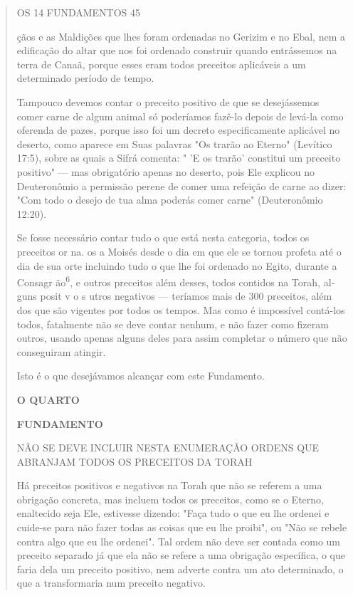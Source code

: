 \begin{quote}
OS 14 FUNDAMENTOS 45

çãos e as Maldições que lhes foram ordenadas no Gerizim e no Ebal, nem a
edi­ficação do altar que nos foi ordenado construir quando entrássemos
na terra de Canaã, porque esses eram todos preceitos aplicáveis a um
determinado pe­ríodo de tempo.

Tampouco devemos contar o preceito positivo de que se desejásse­mos
comer carne de algum animal só poderíamos fazê-lo depois de levá-la
co­mo oferenda de pazes, porque isso foi um decreto especificamente
aplicável no deserto, como aparece em Suas palavras "Os trarão ao
Eterno" (Levítico 17:5), sobre as quais a Sifrá comenta: " 'E os trarão'
constitui um preceito positivo" --- mas obrigatório apenas no deserto,
pois Ele explicou no Deuteronômio a permissão perene de comer uma
refeição de carne ao dizer: "Com todo o dese­jo de tua alma poderás
comer carne" (Deuteronômio 12:20).

Se fosse necessário contar tudo o que está nesta categoria, todos os
preceitos or na. os a Moisés desde o dia em que ele se tornou profeta
até o dia de sua orte incluindo tudo o que lhe foi ordenado no Egito,
durante a Consagr ão\textsuperscript{6}, e outros preceitos além desses,
todos contidos na Torah, al­guns posit v o s utros negativos ---
teríamos mais de 300 preceitos, além dos que são vigentes por todos os
tempos. Mas como é impossível contá-los todos, fatalmente não se deve
contar nenhum, e não fazer como fizeram outros, usan­do apenas alguns
deles para assim completar o número que não conseguiram atingir.

Isto é o que desejávamos alcançar com este Fundamento.

\textbf{O QUARTO}

\textbf{FUNDAMENTO}

NÃO SE DEVE INCLUIR NESTA ENUMERAÇÃO ORDENS QUE ABRANJAM TODOS OS
PRECEITOS DA TORAH

Há preceitos positivos e negativos na Torah que não se referem a uma
obrigação concreta, mas incluem todos os preceitos, como se o Eterno,
enaltecido seja Ele, estivesse dizendo: "Faça tudo o que eu lhe ordenei
e cuide-se para não fazer todas as coisas que eu lhe proibi", ou "Não se
rebele contra algo que eu lhe ordenei". Tal ordem não deve ser contada
como um preceito separado já que ela não se refere a uma obrigação
específica, o que faria dela um preceito positivo, nem adverte contra um
ato determinado, o que a trans­formaria num preceito negativo.


\end{quote}
